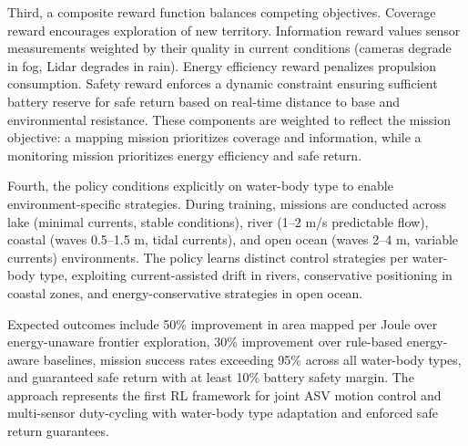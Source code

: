 Third, a composite reward function balances competing objectives. Coverage reward encourages exploration of new territory. Information reward values sensor measurements weighted by their quality in current conditions (cameras degrade in fog, Lidar degrades in rain). Energy efficiency reward penalizes propulsion consumption. Safety reward enforces a dynamic constraint ensuring sufficient battery reserve for safe return based on real-time distance to base and environmental resistance. These components are weighted to reflect the mission objective: a mapping mission prioritizes coverage and information, while a monitoring mission prioritizes energy efficiency and safe return.

Fourth, the policy conditions explicitly on water-body type to enable environment-specific strategies. During training, missions are conducted across lake (minimal currents, stable conditions), river (1--2 m/s predictable flow), coastal (waves 0.5--1.5 m, tidal currents), and open ocean (waves 2--4 m, variable currents) environments. The policy learns distinct control strategies per water-body type, exploiting current-assisted drift in rivers, conservative positioning in coastal zones, and energy-conservative strategies in open ocean.

Expected outcomes include 50\% improvement in area mapped per Joule over energy-unaware frontier exploration, 30\% improvement over rule-based energy-aware baselines, mission success rates exceeding 95\% across all water-body types, and guaranteed safe return with at least 10\% battery safety margin. The approach represents the first RL framework for joint ASV motion control and multi-sensor duty-cycling with water-body type adaptation and enforced safe return guarantees.
